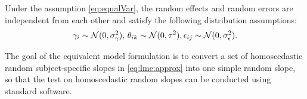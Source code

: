 Under the assumption \eqref{eq:equalVar}, the  random effects and random errors are independent from each other and
satisfy the following distribution assumptions:
\begin{equation}\label{eq:random}
\gamma_i \sim \mathcal{N}(0, \sigma^2_\gamma), \, \theta_{ik} \sim \mathcal{N}(0, \tau^2),\epsilon_{ij} \sim \mathcal{N}(0, \sigma_\epsilon^2).
\end{equation}

The goal of the equivalent model formulation is to convert a set of homoscedastic random subject-specific slopes in \eqref{eq:lme:approx} into one simple  random slope, so that the test on homoscedastic random slopes can be conducted using standard software.


